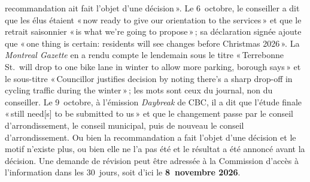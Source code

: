 \documentclass[10pt,letterpaper]{article}
\begin{document}
\begin{enumerate}[nosep,itemsep=0.3em,leftmargin=1.4em]
\begin{minipage}[t]{\linewidth}
    recommandation ait fait l'objet d'une décision\,». Le 6~octobre, le
    conseiller a dit que les élus étaient «\,now ready to give our
    orientation to the services\,» et que le retrait saisonnier «\,is what
    we're going to propose\,»\,; sa déclaration signée ajoute que «\,one
    thing is certain: residents will see changes before Christmas 2026\,».
    La \emph{Montreal Gazette} en a rendu compte le lendemain sous le titre
    «\,Terrebonne St.~will drop to one bike lane in winter to allow more
    parking, borough says\,» et le sous-titre «\,Councillor justifies
    decision by noting there's a sharp drop-off in cycling traffic during
    the winter\,»\,; les mots sont ceux du journal, non du conseiller.
    Le 9~octobre, à l'émission \emph{Daybreak} de CBC, il a dit que l'étude
    finale «\,still need[s] to be submitted to us\,» et que le changement
    passe par le conseil d'arrondissement, le conseil municipal, puis de
    nouveau le conseil d'arrondissement.
    Ou bien la recommandation a fait l'objet d'une décision et le motif
    n'existe plus, ou bien elle ne l'a pas été et le résultat a été annoncé
    avant la décision. Une demande de révision peut être
    adressée à la Commission d'accès à l'information dans les 30~jours, soit
    d'ici le \textbf{8~novembre 2026}.\end{minipage}\vspace{0.35em}
\end{enumerate}
\end{document}
